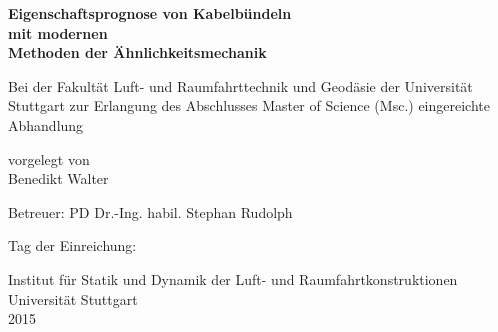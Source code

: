 



\begin{titlepage}



\vspace{10cm}
\begingroup
\centering
{\large
\textbf{Eigenschaftsprognose von Kabelbündeln\\ mit modernen\\ Methoden der Ähnlichkeitsmechanik}\\}
\vspace{3cm}

Bei der Fakultät Luft- und Raumfahrttechnik und Geodäsie der Universität Stuttgart zur Erlangung des Abschlusses Master of Science (Msc.) eingereichte Abhandlung

\vspace{3cm}
vorgelegt von\\

Benedikt Walter\\
\vspace{5cm}

Betreuer: PD Dr.-Ing. habil. Stephan Rudolph\\
\vspace{2cm}

Tag der Einreichung:\\
\vspace{2cm}

Institut für Statik und Dynamik der Luft- und Raumfahrtkonstruktionen\\
Universität Stuttgart\\
2015

\endgroup

\end{titlepage}